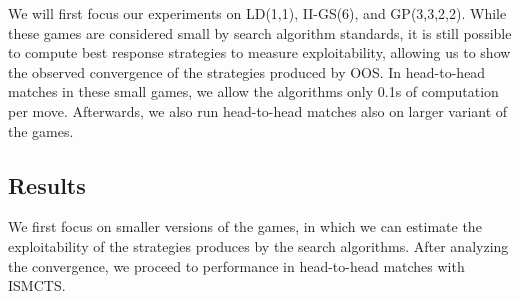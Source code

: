 \documentclass{aamas2015}
\begin{document}
We will first focus our experiments on LD(1,1), II-GS(6), and GP(3,3,2,2). While these games are considered small by search algorithm standards, it is still possible to compute best response strategies to measure exploitability, allowing us to show the observed convergence of the strategies produced by OOS. In head-to-head matches in these small games, we allow the algorithms only 0.1s of computation per move. Afterwards, we also run head-to-head matches also on larger variant of the games. 

\subsection{Results}

We first focus on smaller versions of the games, in which we can estimate the exploitability of the strategies produces by the search algorithms. After analyzing the convergence, we proceed to performance in head-to-head matches with ISMCTS.
\end{document}
